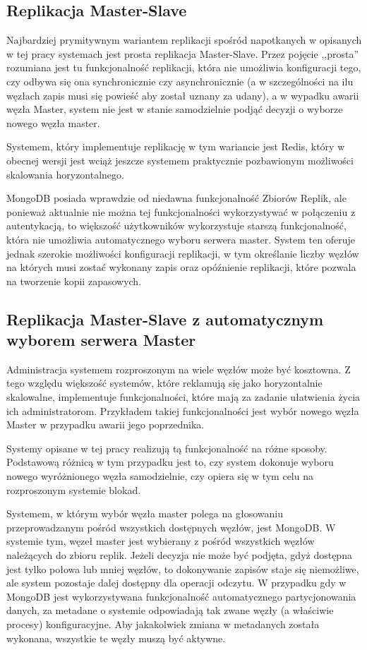 \subsection*{Replikacja Master-Slave}

Najbardziej prymitywnym wariantem replikacji spośród napotkanych w opisanych w tej pracy systemach jest prosta replikacja Master-Slave.
Przez pojęcie ,,prosta'' rozumiana jest tu funkcjonalność replikacji, która nie umożliwia konfiguracji tego, czy odbywa się ona synchronicznie czy asynchronicznie (a w szczególności na ilu węzłach zapis musi się powieść aby został uznany za udany), a w wypadku awarii węzła Master, system nie jest w stanie samodzielnie podjąć decyzji o wyborze nowego węzła master.

Systemem, który implementuje replikację w tym wariancie jest Redis, który w obecnej wersji jest wciąż jeszcze systemem praktycznie pozbawionym możliwości skalowania horyzontalnego.

MongoDB posiada wprawdzie od niedawna funkcjonalność Zbiorów Replik, ale ponieważ aktualnie nie można tej funkcjonalności wykorzystywać w połączeniu z autentykacją, to większość użytkowników wykorzystuje starszą funkcjonalność, która nie umożliwia automatycznego wyboru serwera master.
System ten oferuje jednak szerokie możliwości konfiguracji replikacji, w tym określanie liczby węzłów na których musi zostać wykonany zapis oraz opóźnienie replikacji, które pozwala na tworzenie kopii zapasowych.

\subsection{Replikacja Master-Slave z automatycznym wyborem serwera Master}

Administracja systemem rozproszonym na wiele węzłów może być kosztowna.
Z tego względu większość systemów, które reklamują się jako horyzontalnie skalowalne, implementuje funkcjonalności, które mają za zadanie ułatwienia życia ich administratorom.
Przykładem takiej funkcjonalności jest wybór nowego węzła Master w przypadku awarii jego poprzednika.

Systemy opisane w tej pracy realizują tą funkcjonalność na różne sposoby.
Podstawową różnicą w tym przypadku jest to, czy system dokonuje wyboru nowego wyróżnionego węzła samodzielnie, czy opiera się w tym celu na rozproszonym systemie blokad.

Systemem, w którym wybór węzła master polega na głosowaniu przeprowadzanym pośród wszystkich dostępnych węzłów, jest MongoDB.
W systemie tym, węzeł master jest wybierany z pośród wszystkich węzłów należących do zbioru replik.
Jeżeli decyzja nie może być podjęta, gdyż dostępna jest tylko połowa lub mniej węzłów, to dokonywanie zapisów staje się niemożliwe, ale system pozostaje dalej dostępny dla operacji odczytu.
W przypadku gdy w MongoDB jest wykorzystywana funkcjonalność automatycznego partycjonowania danych, za metadane o systemie odpowiadają tak zwane węzły (a właściwie procesy) konfiguracyjne.
Aby jakakolwiek zmiana w metadanych została wykonana, wszystkie te węzły muszą być aktywne.

